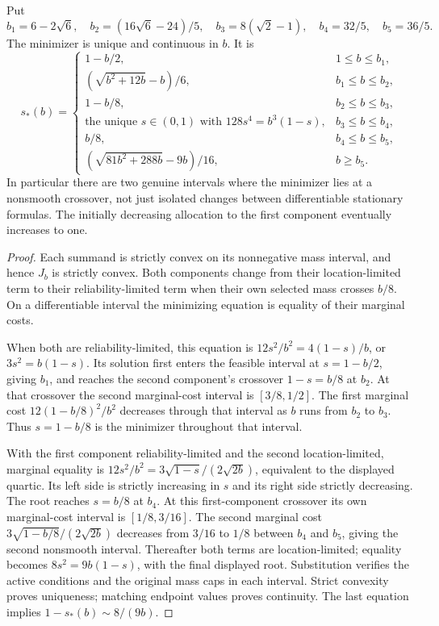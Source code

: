 \begin{proposition}\label{prop:strata-phases}
Put
\[
 b_1=6-2\sqrt6,\quad b_2=(16\sqrt6-24)/5,\quad
 b_3=8(\sqrt2-1),\quad b_4=32/5,\quad b_5=36/5.
\]
The minimizer is unique and continuous in $b$. It is
\begin{equation}\label{eq:strata-phases}
 s_*(b)=
 \begin{cases}
 1-b/2,&1\le b\le b_1,\\
 (\sqrt{b^2+12b}-b)/6,&b_1\le b\le b_2,\\
 1-b/8,&b_2\le b\le b_3,\\
 \text{the unique }s\in(0,1)\text{ with }128s^4=b^3(1-s),
       &b_3\le b\le b_4,\\
 b/8,&b_4\le b\le b_5,\\
 (\sqrt{81b^2+288b}-9b)/16,&b\ge b_5.
 \end{cases}
\end{equation}
In particular there are two genuine intervals where the minimizer lies at a nonsmooth crossover, not just isolated changes between differentiable stationary formulas. The initially decreasing allocation to the first component eventually increases to one.
\end{proposition}
\begin{proof}
Each summand is strictly convex on its nonnegative mass interval, and hence $J_b$ is strictly convex. Both components change from their location-limited term to their reliability-limited term when their own selected mass crosses $b/8$. On a differentiable interval the minimizing equation is equality of their marginal costs.

When both are reliability-limited, this equation is
$12s^2/b^2=4(1-s)/b$, or $3s^2=b(1-s)$. Its solution first enters the feasible interval at $s=1-b/2$, giving $b_1$, and reaches the second component's crossover $1-s=b/8$ at $b_2$. At that crossover the second marginal-cost interval is $[3/8,1/2]$. The first marginal cost $12(1-b/8)^2/b^2$ decreases through that interval as $b$ runs from $b_2$ to $b_3$. Thus $s=1-b/8$ is the minimizer throughout that interval.

With the first component reliability-limited and the second location-limited, marginal equality is
$12s^2/b^2=3\sqrt{1-s}/(2\sqrt{2b})$, equivalent to the displayed quartic. Its left side is strictly increasing in $s$ and its right side strictly decreasing. The root reaches $s=b/8$ at $b_4$. At this first-component crossover its own marginal-cost interval is $[1/8,3/16]$. The second marginal cost $3\sqrt{1-b/8}/(2\sqrt{2b})$ decreases from $3/16$ to $1/8$ between $b_4$ and $b_5$, giving the second nonsmooth interval. Thereafter both terms are location-limited; equality becomes $8s^2=9b(1-s)$, with the final displayed root. Substitution verifies the active conditions and the original mass caps in each interval. Strict convexity proves uniqueness; matching endpoint values proves continuity. The last equation implies $1-s_*(b)\sim8/(9b)$.
\end{proof}

